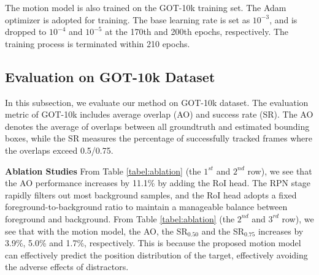 The motion model is also trained on the GOT-10k training set. The Adam optimizer \cite{kingma2014adam} is adopted for training. The base learning rate is set as $10^{-3}$, and is dropped to $10^{-4}$ and $10^{-5}$ at the 170th and 200th epochs, respectively. The training process is terminated within 210 epochs.

\subsection{Evaluation on GOT-10k Dataset}
In this subsection, we evaluate our method on GOT-10k \cite{GOT-10k} dataset.
The evaluation metric of GOT-10k includes average overlap (AO) and success rate (SR). The AO denotes the average of overlaps between all groundtruth and estimated bounding boxes, while the SR measures the percentage of successfully tracked frames where the overlaps exceed 0.5/0.75.

\textbf{Ablation Studies}
From Table \ref{tabel:ablation} (the $1^{st}$ and $2^{nd}$ row), we see that the AO performance increases by 11.1\% by adding the RoI head. The RPN stage rapidly filters out most background samples, and the RoI head adopts a fixed foreground-to-background ratio to maintain a manageable balance between foreground and background.
From Table \ref{tabel:ablation} (the $2^{nd}$ and $3^{rd}$ row), we see that with the motion model, the AO, the SR$_{0.50}$ and the SR$_{0.75}$ increases by 3.9\%, 5.0\% and 1.7\%, respectively. This is because the proposed motion model can effectively predict the position distribution of the target, effectively avoiding the adverse effects of distractors. 

